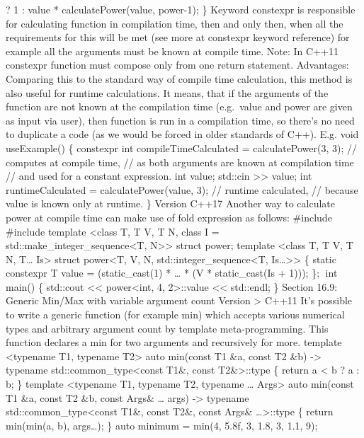 ? 1 : value * calculatePower(value, power-1); \} Keyword constexpr is
responsible for calculating function in compilation time, then and only
then, when all the requirements for this will be met (see more at
constexpr keyword reference) for example all the arguments must be known
at compile time. Note: In C++11 constexpr function must compose only
from one return statement. Advantages: Comparing this to the standard
way of compile time calculation, this method is also useful for runtime
calculations. It means, that if the arguments of the function are not
known at the compilation time (e.g.~value and power are given as input
via user), then function is run in a compilation time, so there's no
need to duplicate a code (as we would be forced in older standards of
C++). E.g. void useExample() \{ constexpr int compileTimeCalculated =
calculatePower(3, 3); // computes at compile time, // as both arguments
are known at compilation time // and used for a constant expression. int
value; std::cin \textgreater\textgreater{} value; int runtimeCalculated
= calculatePower(value, 3); // runtime calculated, // because value is
known only at runtime. \} Version C++17 Another way to calculate power
at compile time can make use of fold expression as follows: \#include
\#include template \textless class T, T V, T N, class I =
std::make\_integer\_sequence\textless T, N\textgreater\textgreater{}
struct power; template \textless class T, T V, T N, T\ldots{}
Is\textgreater{} struct power\textless T, V, N,
std::integer\_sequence\textless T, Is\ldots\textgreater\textgreater{} \{
static constexpr T value = (static\_cast(1) * \ldots{} * (V *
static\_cast(Is + 1))); \}; int main() \{ std::cout
\textless\textless{} power\textless int, 4, 2\textgreater::value
\textless\textless{} std::endl; \} Section 16.9: Generic Min/Max with
variable argument count Version \textgreater{} C++11 It's possible to
write a generic function (for example min) which accepts various
numerical types and arbitrary argument count by template
meta-programming. This function declares a min for two arguments and
recursively for more. template \textless typename T1, typename
T2\textgreater{} auto min(const T1 \&a, const T2 \&b) -\textgreater{}
typename std::common\_type\textless const T1\&, const
T2\&\textgreater::type \{ return a \textless{} b ? a : b; \} template
\textless typename T1, typename T2, typename \ldots{} Args\textgreater{}
auto min(const T1 \&a, const T2 \&b, const Args\& \ldots{} args)
-\textgreater{} typename std::common\_type\textless const T1\&, const
T2\&, const Args\& \ldots\textgreater::type \{ return min(min(a, b),
args\ldots); \} auto minimum = min(4, 5.8f, 3, 1.8, 3, 1.1, 9);

